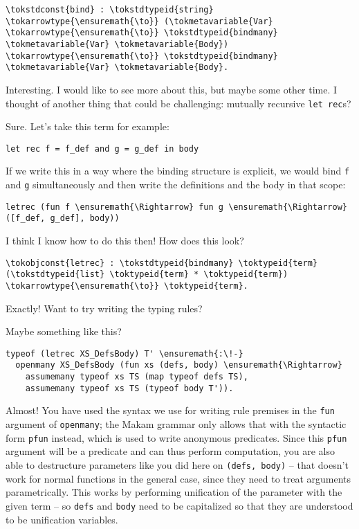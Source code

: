 \begin{verbatim}
\tokstdconst{bind} : \tokstdtypeid{string} \tokarrowtype{\ensuremath{\to}} (\tokmetavariable{Var} \tokarrowtype{\ensuremath{\to}} \tokstdtypeid{bindmany} \tokmetavariable{Var} \tokmetavariable{Body}) \tokarrowtype{\ensuremath{\to}} \tokstdtypeid{bindmany} \tokmetavariable{Var} \tokmetavariable{Body}.
\end{verbatim}

\heroSTUDENT{} Interesting. I would like to see more about this, but maybe
some other time. I thought of another thing that could be challenging:
mutually recursive \texttt{let\ rec}s?

\heroADVISOR{} Sure. Let's take this term for example:

\begin{verbatim}
let rec f = f_def and g = g_def in body
\end{verbatim}

\noindent
If we write this in a way where the binding structure is explicit, we
would bind \texttt{f} and \texttt{g} simultaneously and then write the
definitions and the body in that scope:

\begin{verbatim}
letrec (fun f \ensuremath{\Rightarrow} fun g \ensuremath{\Rightarrow} ([f_def, g_def], body))
\end{verbatim}

\heroSTUDENT{} I think I know how to do this then! How does this look?

\begin{verbatim}
\tokobjconst{letrec} : \tokstdtypeid{bindmany} \toktypeid{term} (\tokstdtypeid{list} \toktypeid{term} * \toktypeid{term}) \tokarrowtype{\ensuremath{\to}} \toktypeid{term}.
\end{verbatim}

\heroADVISOR{} Exactly! Want to try writing the typing rules?

\heroSTUDENT{} Maybe something like this?

\begin{verbatim}
typeof (letrec XS_DefsBody) T' \ensuremath{:\!-}
  openmany XS_DefsBody (fun xs (defs, body) \ensuremath{\Rightarrow}
    assumemany typeof xs TS (map typeof defs TS),
    assumemany typeof xs TS (typeof body T')).
\end{verbatim}

\heroADVISOR{} Almost! You have used the syntax we use for writing rule
premises in the \texttt{fun} argument of \texttt{openmany}; the Makam
grammar only allows that with the syntactic form \texttt{pfun} instead,
which is used to write anonymous predicates. Since this \texttt{pfun}
argument will be a predicate and can thus perform computation, you are
also able to destructure parameters like you did here on
\texttt{(defs,\ body)} -- that doesn't work for normal functions in the
general case, since they need to treat arguments parametrically. This
works by performing unification of the parameter with the given term --
so \texttt{defs} and \texttt{body} need to be capitalized so that they
are understood to be unification variables.

